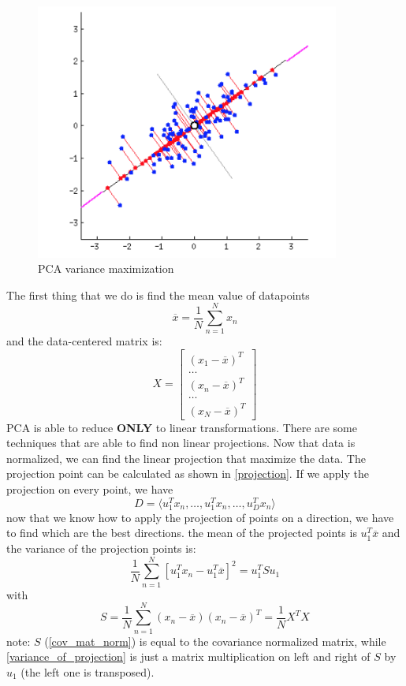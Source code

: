 \begin{figure}[H]
    \centering
    \includegraphics[width=10cm]{images/DimRed/pca.png}
    \caption{PCA variance maximization}
    \label{fig:pca}
\end{figure}

The first thing that we do is find the mean value of datapoints
\begin{equation}
    \overline{x} = \frac{1}{N}\sum_{n=1}^{N}x_n 
\end{equation}
and the data-centered matrix is:
\begin{equation}
    X=\begin{bmatrix}
    (x_{1} - \overline{x})^{T} \\ \dots \\ (x_{n} - \overline{x})^{T} \\ \dots \\ (x_{N} - \overline{x})^{T}
    \end{bmatrix}
\end{equation}
PCA is able to reduce \textbf{ONLY} to linear transformations. There are some techniques that are able to find non linear projections.
Now that data is normalized, we can find the linear projection that maximize the data. The projection point can be calculated as shown in \ref{projection}. If we apply the projection on every point, we have
\begin{equation}
    D = \langle u_{1}^{T}x_{n}, \dots, u_{1}^{T}x_{n}, \dots, u_{D}^{T}x_{n}\rangle
\end{equation}
now that we know how to apply the projection of points on a direction, we have to find which are the best directions. the mean of the projected points is $u_{1}^{T}\overline{x}$ and the variance of the projection points is:
\begin{equation}
\label{variance_of_projection}
    \frac{1}{N} \sum_{n=1}^{N}[u_{1}^{T}x_{n} - u_{1}^{T}\overline{x}]^{2} = u_{1}^{T}Su_{1}
\end{equation}
with
\begin{equation}
\label{cov_mat_norm}
    S = \frac{1}{N}\sum_{n=1}^{N}(x_{n} - \overline{x})(x_{n} - \overline{x})^{T} = \frac{1}{N}X^{T}X
\end{equation}
note: $S$ (\ref{cov_mat_norm}) is equal to the covariance normalized matrix, while \ref{variance_of_projection} is just a matrix multiplication on left and right of $S$ by $u_{1}$ (the left one is transposed).

